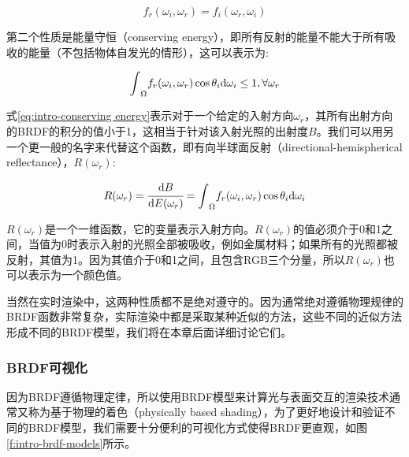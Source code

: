 \begin{equation}
	f_r(\omega_i,\omega_r)=f_i(\omega_r,\omega_i)
\end{equation}

第二个性质是能量守恒（conserving energy），即所有反射的能量不能大于所有吸收的能量（不包括物体自发光的情形），这可以表示为:

\begin{equation}\label{eq:intro-conserving energy}
	{\rm \int}_{\Omega}f_r(\omega_i,\omega_r)\cos\theta_i {\rm d}\omega_i \leq 1,\forall\omega_r
\end{equation}

式\ref{eq:intro-conserving energy}表示对于一个给定的入射方向$\omega_r$，其所有出射方向的BRDF的积分的值小于1，这相当于针对该入射光照的出射度$B$。我们可以用另一个更一般的名字来代替这个函数，即有向半球面反射（directional-hemispherical reflectance），$R(\omega_r)$:

\begin{equation}
	R(\omega_r)= \cfrac{{\rm d}B}{{\rm d}E(\omega_r)}={\rm \int}_{\Omega}f_r(\omega_i,\omega_r)\cos\theta_i {\rm d}\omega_i
\end{equation}

\noindent $R(\omega_r)$是一个一维函数，它的变量表示入射方向。$R(\omega_r)$的值必须介于0和1之间，当值为0时表示入射的光照全部被吸收，例如金属材料；如果所有的光照都被反射，其值为1。因为其值介于0和1之间，且包含RGB三个分量，所以$R(\omega_r)$也可以表示为一个颜色值。

当然在实时渲染中，这两种性质都不是绝对遵守的。因为通常绝对遵循物理规律的BRDF函数非常复杂，实际渲染中都是采取某种近似的方法，这些不同的近似方法形成不同的BRDF模型，我们将在本章后面详细讨论它们。






\subsubsection{BRDF可视化}
因为BRDF遵循物理定律，所以使用BRDF模型来计算光与表面交互的渲染技术通常又称为基于物理的着色（physically based shading），为了更好地设计和验证不同的BRDF模型，我们需要十分便利的可视化方式使得BRDF更直观，如图\ref{f:intro-brdf-models}所示。

